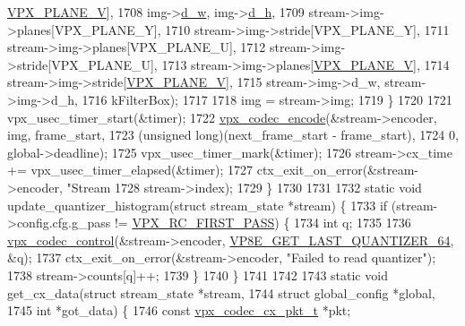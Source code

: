 \begin{DoxyCodeInclude}
{{{{{{{{{{{{{{{{{{{{{{{{{{{{{{{{{{{{{{{{{{{{{{{      \hyperlink{vpx__image_8h_aca9436ec761457cc6d2e356e0ac2fd23}{VPX\_PLANE\_V}],
1708               img->\hyperlink{structvpx__image_a806bf23143bf00a0b3fdbd6ba030c483}{d\_w}, img->\hyperlink{structvpx__image_a31bc5f045d4f3c2b6bb0f57bb53078e7}{d\_h},
1709               stream->img->planes[VPX\_PLANE\_Y],
1710               stream->img->stride[VPX\_PLANE\_Y],
1711               stream->img->planes[VPX\_PLANE\_U],
1712               stream->img->stride[VPX\_PLANE\_U],
1713               stream->img->planes[\hyperlink{vpx__image_8h_aca9436ec761457cc6d2e356e0ac2fd23}{VPX\_PLANE\_V}],
1714               stream->img->stride[\hyperlink{vpx__image_8h_aca9436ec761457cc6d2e356e0ac2fd23}{VPX\_PLANE\_V}],
1715               stream->img->d\_w, stream->img->d\_h,
1716               kFilterBox);
1717 
1718     img = stream->img;
1719   \}
1720 
1721   vpx\_usec\_timer\_start(&timer);
1722   \hyperlink{group__encoder_gaf990542e2aeb389f05fae3e9c7803639}{vpx\_codec\_encode}(&stream->encoder, img, frame\_start,
1723                    (\textcolor{keywordtype}{unsigned} \textcolor{keywordtype}{long})(next\_frame\_start - frame\_start),
1724                    0, global->deadline);
1725   vpx\_usec\_timer\_mark(&timer);
1726   stream->cx\_time += vpx\_usec\_timer\_elapsed(&timer);
1727   ctx\_exit\_on\_error(&stream->encoder, \textcolor{stringliteral}{"Stream %
1728                     stream->index);
1729 \}
1730 
1731 
1732 \textcolor{keyword}{static} \textcolor{keywordtype}{void} update\_quantizer\_histogram(\textcolor{keyword}{struct} stream\_state *stream) \{
1733   \textcolor{keywordflow}{if} (stream->config.cfg.g\_pass != \hyperlink{group__encoder_gga476c5417f9c15a1dc5d3f68fa44c493faa0765945345b160905f3b762986dae3b}{VPX\_RC\_FIRST\_PASS}) \{
1734     \textcolor{keywordtype}{int} q;
1735 
1736     \hyperlink{group__codec_gac1b91e04698c1bd4c0a2b8aa85b08cd2}{vpx\_codec\_control}(&stream->encoder, 
      \hyperlink{group__vp8__encoder_gga6deae3d561c838952552c3d3756322ecad2cfc9712d2eab30b5a59a60d0daaade}{VP8E\_GET\_LAST\_QUANTIZER\_64}, &q);
1737     ctx\_exit\_on\_error(&stream->encoder, \textcolor{stringliteral}{"Failed to read quantizer"});
1738     stream->counts[q]++;
1739   \}
1740 \}
1741 
1742 
1743 \textcolor{keyword}{static} \textcolor{keywordtype}{void} get\_cx\_data(\textcolor{keyword}{struct} stream\_state  *stream,
1744                         \textcolor{keyword}{struct} global\_config *global,
1745                         \textcolor{keywordtype}{int}                  *got\_data) \{
1746   \textcolor{keyword}{const} \hyperlink{structvpx__codec__cx__pkt}{vpx\_codec\_cx\_pkt\_t} *pkt;
}}}}}}}}}}}}}}}}}}}}}}}}}}}}}}}}}}}}}}}}}}}}}}}}
\end{DoxyCodeInclude}
